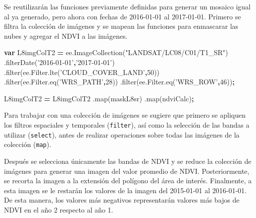 \documentclass[
]{article}
\newenvironment{Shaded}{\begin{snugshade}}{\end{snugshade}}
\newcommand{\AttributeTok}[1]{\textcolor[rgb]{0.77,0.63,0.00}{#1}}
\newcommand{\DecValTok}[1]{\textcolor[rgb]{0.00,0.00,0.81}{#1}}
\newcommand{\KeywordTok}[1]{\textcolor[rgb]{0.13,0.29,0.53}{\textbf{#1}}}
\newcommand{\NormalTok}[1]{#1}
\newcommand{\OperatorTok}[1]{\textcolor[rgb]{0.81,0.36,0.00}{\textbf{#1}}}
\newcommand{\StringTok}[1]{\textcolor[rgb]{0.31,0.60,0.02}{#1}}
\newcommand{\VariableTok}[1]{\textcolor[rgb]{0.00,0.00,0.00}{#1}}
\begin{document}
Se reutilizarán las funciones previamente definidas para generar un
mosaico igual al ya generado, pero ahora con fechas de 2016-01-01 al
2017-01-01. Primero se filtra la colección de imágenes y se mapean las
funciones para enmascarar las nubes y agregar el NDVI a las imágenes.

\begin{Shaded}
\begin{Highlighting}[]
\KeywordTok{var}\NormalTok{ L8imgColT2 }\OperatorTok{=} \VariableTok{ee}\NormalTok{.}\AttributeTok{ImageCollection}\NormalTok{(}\StringTok{"LANDSAT/LC08/C01/T1_SR"}\NormalTok{)}
\NormalTok{  .}\AttributeTok{filterDate}\NormalTok{(}\StringTok{'2016-01-01'}\OperatorTok{,}\StringTok{'2017-01-01'}\NormalTok{)}
\NormalTok{  .}\AttributeTok{filter}\NormalTok{(}\VariableTok{ee}\NormalTok{.}\VariableTok{Filter}\NormalTok{.}\AttributeTok{lte}\NormalTok{(}\StringTok{'CLOUD_COVER_LAND'}\OperatorTok{,}\DecValTok{50}\NormalTok{))}
\NormalTok{  .}\AttributeTok{filter}\NormalTok{(}\VariableTok{ee}\NormalTok{.}\VariableTok{Filter}\NormalTok{.}\AttributeTok{eq}\NormalTok{(}\StringTok{'WRS_PATH'}\OperatorTok{,}\DecValTok{28}\NormalTok{))}
\NormalTok{  .}\AttributeTok{filter}\NormalTok{(}\VariableTok{ee}\NormalTok{.}\VariableTok{Filter}\NormalTok{.}\AttributeTok{eq}\NormalTok{(}\StringTok{'WRS_ROW'}\OperatorTok{,}\DecValTok{46}\NormalTok{))}\OperatorTok{;}

\NormalTok{L8imgColT2 }\OperatorTok{=}\NormalTok{ L8imgColT2}
\NormalTok{  .}\AttributeTok{map}\NormalTok{(maskL8sr)}
\NormalTok{  .}\AttributeTok{map}\NormalTok{(ndviCalc)}\OperatorTok{;}
\end{Highlighting}
\end{Shaded}

\begin{tipblock}
Para trabajar con una colección de imágenes se sugiere que primero se
apliquen los filtros espaciales y temporales (\texttt{filter}), así como
la selección de las bandas a utilizar (\texttt{select}), antes de
realizar operaciones sobre todas las imágenes de la colección
(\texttt{map}).

\end{tipblock}

Después se selecciona únicamente las bandas de NDVI y se reduce la
colección de imágenes para generar una imagen del valor promedio de
NDVI. Posteriormente, se recorta la imagen a la extensión del polígono
del área de interés. Finalmente, a esta imagen se le restarán los
valores de la imagen del 2015-01-01 al 2016-01-01. De esta manera, los
valores más negativos representarán valores más bajos de NDVI en el año
2 respecto al año 1.
\end{document}
